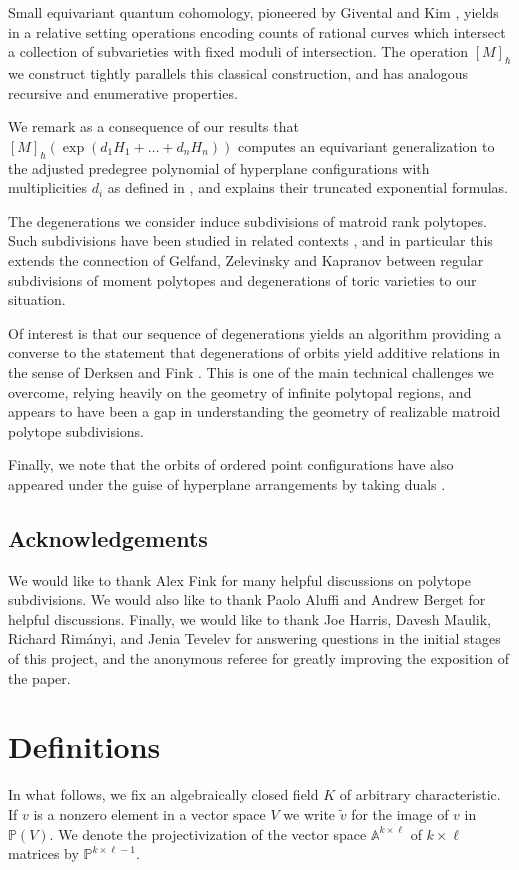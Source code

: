 \documentclass[12pt]{amsart}
\newcommand{\mb}{\mathbb}
\newcommand{\wt}{\widetilde}
\theoremstyle{plain}
\theoremstyle{definition}
\theoremstyle{remark}
\begin{document}
Small equivariant quantum cohomology, pioneered by Givental and Kim \cite{Kim93}, yields in a relative setting operations encoding counts of rational curves which intersect  a collection of subvarieties with fixed moduli of intersection. The operation $[M]_{\hbar}$ we construct tightly parallels this classical construction, and has analogous recursive and enumerative properties.

We remark as a consequence of our results that $[M]_\hbar(\exp(d_1H_1+\ldots+d_nH_n))$ computes an equivariant generalization to the adjusted predegree polynomial of hyperplane configurations with multiplicities $d_i$ as defined in \cite{AF00, Serdica}, and explains their truncated exponential formulas.

The degenerations we consider induce subdivisions of matroid rank polytopes. Such subdivisions have been studied in related contexts \cite{Derksen,GelfandZelevinsky,Kapranov,SpeThesis,SpeInvariant}, and in particular this extends the connection of Gelfand, Zelevinsky and Kapranov \cite{GelfandZelevinsky} between regular subdivisions of moment polytopes and degenerations of toric varieties to our situation.

Of interest is that our sequence of degenerations yields an algorithm providing a converse to the statement that degenerations of orbits yield additive relations in the sense of Derksen and Fink \cite{Derksen}. This is one of the main technical challenges we overcome, relying heavily on the geometry of infinite polytopal regions, and appears to have been a gap in understanding the geometry of realizable matroid polytope subdivisions.

Finally, we note that the orbits of ordered point configurations have also appeared under the guise of hyperplane arrangements by taking duals \cite{ Alexeev, Hacking,Kapranov, Keel}.

 \subsection{Acknowledgements}
 We would like to thank Alex Fink for many helpful discussions on polytope subdivisions. We would also like to thank Paolo Aluffi and Andrew Berget for helpful discussions. Finally, we would like to thank Joe Harris, Davesh Maulik, Richard Rim\'anyi, and Jenia Tevelev for answering questions in the initial stages of this project, and the anonymous referee for greatly improving the exposition of the paper.

\section{Definitions}\label{NotandConv}
 In what follows, we fix an algebraically closed field $K$ of arbitrary characteristic. If $v$ is a nonzero element in a vector space $V$ we write $\wt{v}$ for the image of $v$ in $\mb{P}(V)$. We denote the projectivization of the vector space $\mb{A}^{k \times \ell}$ of $k \times \ell$ matrices by $\mb{P}^{k \times \ell-1}$.
 
\end{document}
